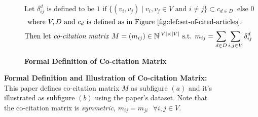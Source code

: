 \begin{figure}[t!]
    \begin{subfigure}[b]{1\textwidth}
        \[\text{Let } \delta^d_{ij} \text{ is defined to be } 1 \text{ if } \{(v_i, v_j) \mid v_i, v_j \in V \text{ and } i \neq j \} \subset c_{d \in D} \ \text{ else } 0\]
        \[\text{ where } V, D \text{ and } c_d \text{ is defined as in Figure \ref{fig:def:set-of-cited-articles}}. \]
        \[\text{Then let \textit{co-citation matrix} } M = (m_{ij}) \in \Bbb{N}^{|V| \times |V|} \text{ s.t. } m_{ij} = \sum_{d \in D}\sum_{i,j \in V}\delta^d_{ij}\]
        \caption{\textbf{Formal Definition of Co-citation Matrix}}
        \label{subfig:co-cites:def}
    \end{subfigure}
    \vfill
    \begin{subfigure}[b]{1\textwidth}
    \end{subfigure}
    \caption{\textbf{Formal Definition and Illustration of Co-citation Matrix:} This paper defines co-citation matrix $M$ as subfigure $(a)$ and it's illustrated as subfigure $(b)$ using the paper's dataset. Note that the co-citation matrix is \textit{symmetric}, $m_{ij} = m_{ji} \text{ } \forall i,j \in V$.}
    \label{fig:def-illus-co-cites}      
\end{figure}
